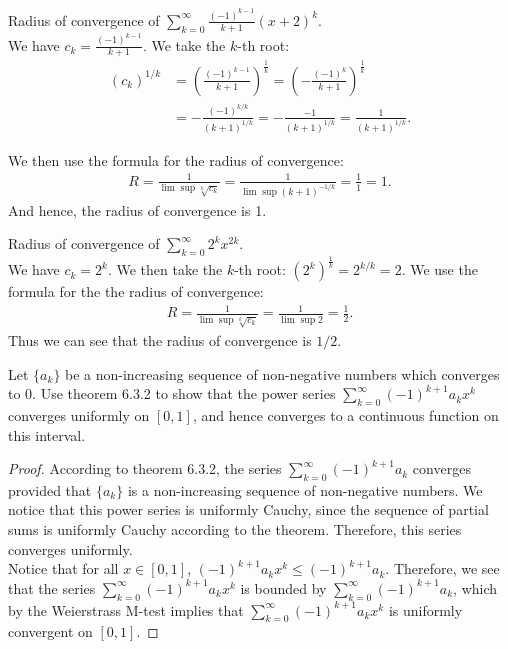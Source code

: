 \documentclass[12pt]{book}
\newenvironment{exercise}[2][Exercise]{\begin{trivlist}
\item[\hskip \labelsep {\bfseries #1}\hskip \labelsep {\bfseries #2.}]}{\end{trivlist}}
\begin{document}
\begin{exercise}{6.4.5}
Radius of convergence of $\sum_{k=0}^\infty \frac{(-1)^{k-1}}{k+1} (x+2)^k$.  \\

We have $c_k= \frac{(-1)^{k-1}}{k+1}$. We take the $k$-th root:
    \begin{align*}
    (c_k)^{1/k} &=  \left( \frac{(-1)^{k-1}}{k+1} \right)^{\frac{1}{k}} = \left(- \frac{(-1)^k}{k+1} \right)^{\frac{1}{k}} \\
                &= - \frac{(-1)^{k/k}}{\left(k+1\right)^{1/k}} = - \frac{-1}{\left(k+1\right)^{1/k}} = \frac{1}{\left(k+1\right)^{1/k}}.
    \end{align*}

    We then use the formula for the radius of convergence:
    \begin{align*}
    R = \frac{1}{\lim \sup \sqrt[k]{c_k}} = \frac{1}{\lim \sup \left(k+1\right)^{-1/k}} = \frac{1}{1} = 1.
    \end{align*}
    And hence, the radius of convergence is 1.
\end{exercise}



\begin{exercise}{6.4.8}
Radius of convergence of $\sum_{k=0}^\infty 2^k x^{2k}$.  \\

We have $c_k= 2^k$. We then take the $k$-th root: $\left( 2^k \right)^{\frac{1}{k}} =2^{k/k} = 2$. We use the formula for the the radius of convergence:
    \begin{align*}
      R = \frac{1}{\lim \sup \sqrt[k]{c_k}} = \frac{1}{\lim \sup 2} = \frac{1}{2}.
    \end{align*}
Thus we can see that the radius of convergence is $1/2$.
\end{exercise}



\begin{exercise}{6.4.10}
Let $\{a_k\}$ be a non-increasing sequence of non-negative numbers which converges to 0. Use theorem 6.3.2 to show that the power series $\sum_{k=0}^\infty (-1)^{k+1} a_k x^k$ converges uniformly on $[0,1]$, and hence converges to a continuous function on this interval.

    \begin{proof}
    According to theorem 6.3.2, the series $\sum_{k=0}^\infty \left(-1\right)^{k+1} a_k$ converges provided that $\{a_k\}$ is a non-increasing sequence of non-negative numbers. We notice that this power series is uniformly Cauchy, since the sequence of partial sums is uniformly Cauchy according to the theorem. Therefore, this series converges uniformly. \\
    Notice that for all $x \in [0,1]$, $\left(-1\right)^{k+1} a_k x^k \leq \left(-1\right)^{k+1} a_k$. Therefore, we see that the series $\sum_{k=0}^\infty (-1)^{k+1} a_k x^k$  is bounded by $\sum_{k=0}^\infty (-1)^{k+1} a_k$, which by the Weierstrass M-test implies that $\sum_{k=0}^\infty (-1)^{k+1} a_k x^k$  is uniformly convergent on $[0,1]$.
    \end{proof}
\end{exercise}
\end{document}
